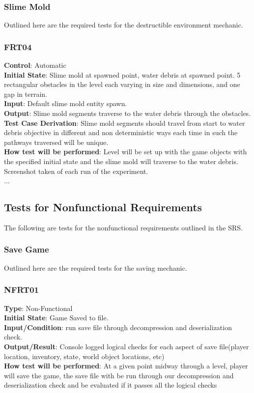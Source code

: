 \documentclass[12pt, titlepage]{article}
\begin{document}
\subsubsection{Slime Mold}

Outlined here are the required tests for the destructible environment mechanic.

\subsubsection{FRT04}

\textbf{Control}: Automatic\\
\textbf{Initial State}: Slime mold at spawned point, water debris at spawned point. 5 rectangular obstacles in the level each varying in size and dimensions, and one gap in terrain.\\
\textbf{Input}: Default slime mold entity spawn.\\
\textbf{Output}: Slime mold segments traverse to the water debris through the obstacles.\\
\textbf{Test Case Derivation}: Slime mold segments should travel from start to water debris objective in different and non deterministic ways each time in such the pathways traversed will be unique.\\
\textbf{How test will be performed}: Level will be set up with the game objects with  the specified initial state and the slime mold will traverse to the water debris. Screenshot taken of each run of the experiment.\\
...

\subsection{Tests for Nonfunctional Requirements}

The following are tests for the nonfunctional requirements outlined in the SRS.

\subsubsection{Save Game}

Outlined here are the required tests for the saving mechanic.

\subsubsection{NFRT01}

\textbf{Type}: Non-Functional\\
\textbf{Initial State}: Game Saved to file.\\
\textbf{Input/Condition}: run save file through decompression and deserialization check.\\
\textbf{Output/Result}: Console logged logical checks for each aspect of save file(player location, inventory, state, world object locations, etc)\\
\textbf{How test will be performed}: At a given point midway through a level, player will save the game, the save file with be run through our decompression and deserialization check and be evaluated if it passes all the logical checks\\
\end{document}
